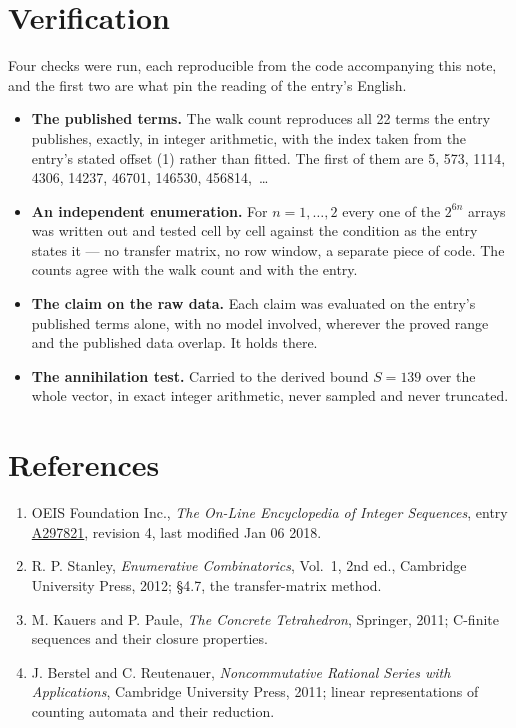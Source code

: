 \documentclass[11pt]{article}
\theoremstyle{definition}
\begin{document}
\section{Verification}

Four checks were run, each reproducible from the code accompanying this note, and the first two are what pin the reading of the entry's English.

\begin{itemize}

\item {\bfseries The published terms.} The walk count reproduces all 22 terms the entry publishes, exactly, in integer arithmetic, with the index taken from the entry's stated offset (1) rather than fitted. The first of them are 5, 573, 1114, 4306, 14237, 46701, 146530, 456814,~\dots

\item {\bfseries An independent enumeration.} For $n = 1,\dots,2$ every one of the $2^{6n}$ arrays was written out and tested cell by cell against the condition as the entry states it --- no transfer matrix, no row window, a separate piece of code. The counts agree with the walk count and with the entry.

\item {\bfseries The claim on the raw data.} Each claim was evaluated on the entry's published terms alone, with no model involved, wherever the proved range and the published data overlap. It holds there.

\item {\bfseries The annihilation test.} Carried to the derived bound $S = 139$ over the whole vector, in exact integer arithmetic, never sampled and never truncated.

\end{itemize}

\section{References}

\begin{enumerate}

\item OEIS Foundation Inc., \emph{The On-Line Encyclopedia of Integer Sequences}, entry \href{https://oeis.org/A297821}{A297821}, revision 4, last modified Jan 06 2018.

\item R. P. Stanley, \emph{Enumerative Combinatorics}, Vol.~1, 2nd ed., Cambridge University Press, 2012; \S4.7, the transfer-matrix method.

\item M. Kauers and P. Paule, \emph{The Concrete Tetrahedron}, Springer, 2011; C-finite sequences and their closure properties.

\item J. Berstel and C. Reutenauer, \emph{Noncommutative Rational Series with Applications}, Cambridge University Press, 2011; linear representations of counting automata and their reduction.

\end{enumerate}
\end{document}

